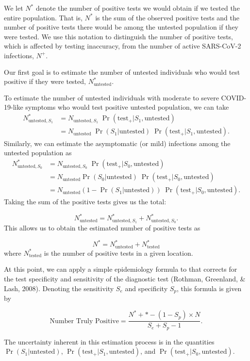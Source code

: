 \documentclass[12pt,twoside]{smiththesis}
\begin{document}
We let \(N^*\) denote the number of positive tests we would obtain if we tested the entire population. That is, \(N^*\) is the sum of the observed positive tests and the number of positive tests there would be among the untested population if they were tested. We use this notation to distinguish the number of positive tests, which is affected by testing inaccuracy, from the number of active SARS-CoV-2 infections, \(N^+\).

Our first goal is to estimate the number of untested individuals who would test positive if they were tested, \(N^*_{\text{untested}}\).

To estimate the number of untested individuals with moderate to severe COVID-19-like symptoms who would test positive untested population, we can take
\begin{align*}
N^*_{\text{untested},S_1} &=N_{\text{untested},S_1} \; \Pr(\text{test}_+ | S_1,\text{untested})\\
&=N_{\text{untested}} \; \Pr(S_1|\text{untested}) \; \Pr(\text{test}_+ | S_1,\text{untested}).
\end{align*}
Similarly, we can estimate the asymptomatic (or mild) infections among the untested population as
\begin{align*}
N^*_{\text{untested},S_0} &=N_{\text{untested},S_0} \; \Pr(\text{test}_+ | S_0,\text{untested})\\
&=N_{\text{untested}} \Pr(S_0|\text{untested}) \; \Pr(\text{test}_+ | S_0,\text{untested})\\
&=N_{\text{untested}}(1-\Pr(S_1|\text{untested})) \; \Pr(\text{test}_+ | S_0,\text{untested}).
\end{align*}
Taking the sum of the positive tests gives us the total:

\[N^*_{\text{untested}} = N^*_{\text{untested},S_1} + N^*_{\text{untested},S_0}.\]
This allows us to obtain the estimated number of positive tests as

\[N^* = N^*_{\text{untested}} +N^*_{\text{tested}}\]
where \(N^*_{\text{tested}}\) is the number of positive tests in a given location.

At this point, we can apply a simple epidemiology formula to that corrects for the test specificity and sensitivity of the diagnostic test (Rothman, Greenland, \& Lash, 2008). Denoting the sensitivity \(S_e\) and specificity \(S_p\), this formula is given by

\[\text{Number Truly Positive} = \dfrac{N^*+* - (1-S_p) \times N}{S_e+S_p-1}.\]

The uncertainty inherent in this estimation process is in the quantities \(\Pr(S_1|\text{untested})\), \(\Pr(\text{test}_+| S_1,\text{untested})\), and \(\Pr(\text{test}_+ | S_0,\text{untested})\).
\end{document}
